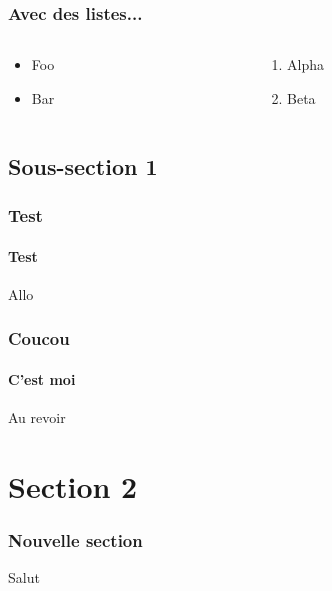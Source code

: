 \documentclass[aspectratio=169, usepdftitle=false, xcolor={dvipsnames}]{beamer}
\begin{document}
\begin{frame}[c]
    \frametitle{Avec des listes...}
    
    \begin{columns}
        \begin{column}{0.5\textwidth}
            \begin{itemize}
                \item Foo
                \item Bar
            \end{itemize}
        \end{column}
        \begin{column}{0.5\textwidth}
           \begin{enumerate}
               \item Alpha
               \item Beta
           \end{enumerate} 
        \end{column}
    \end{columns}
\end{frame}

\subsection{Sous-section 1}

\begin{frame}[c]
    \frametitle{Test}
    \framesubtitle{Test}
    
    Allo
\end{frame}

\begin{frame}[c]
    \frametitle{Coucou}
    \framesubtitle{C'est moi}
    
    Au revoir
\end{frame}

\section{Section 2}

\begin{frame}[c]
    \frametitle{Nouvelle section}
    Salut
\end{frame}
\end{document}
